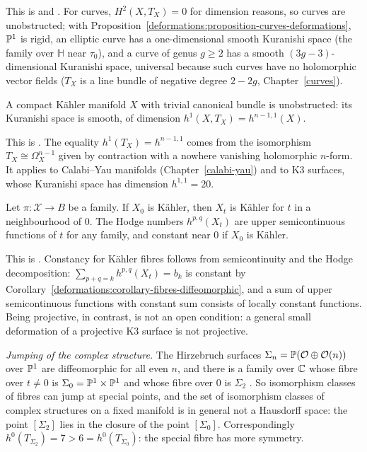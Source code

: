This is \cite[Chapter 6]{huybrechts-complex} and \cite[Chapter 9]{voisin-hodge-1}. For curves, $H^2(X, T_X) = 0$ for dimension reasons, so curves are unobstructed; with
Proposition~\ref{deformations:proposition-curves-deformations}, $\mathbb{P}^1$ is rigid, an elliptic curve has a one-dimensional smooth Kuranishi space (the family over $\mathbb{H}$ near $\tau_0$), and a curve of genus $g \geq 2$
has a smooth $(3g - 3)$-dimensional Kuranishi space, universal because such curves have no holomorphic vector fields ($T_X$ is a line bundle of negative degree $2 - 2g$, Chapter~\ref{curves}).

\begin{theorem}\label{deformations:theorem-btt}
A compact K\"ahler manifold $X$ with trivial canonical bundle is unobstructed: its Kuranishi space is smooth, of dimension $h^1(X, T_X) = h^{n-1,1}(X)$.
\end{theorem}

This is \cite[Chapter 6]{huybrechts-complex}. The equality $h^1(T_X) = h^{n-1,1}$ comes from the isomorphism $T_X \cong \Omega^{n-1}_X$ given by contraction with a nowhere vanishing holomorphic $n$-form. It applies
to Calabi--Yau manifolds (Chapter~\ref{calabi-yau}) and to K3 surfaces, whose Kuranishi space has dimension $h^{1,1} = 20$.

\begin{theorem}\label{deformations:theorem-kahler-stability}
Let $\pi \colon \mathcal{X} \to B$ be a family. If $X_0$ is K\"ahler, then $X_t$ is K\"ahler for $t$ in a neighbourhood of $0$. The Hodge numbers $h^{p,q}(X_t)$ are upper semicontinuous functions of $t$ for any
family, and constant near $0$ if $X_0$ is K\"ahler.
\end{theorem}

This is \cite[Chapter 9]{voisin-hodge-1}. Constancy for K\"ahler fibres follows from semicontinuity and the Hodge decomposition: $\sum_{p+q=k}h^{p,q}(X_t) = b_k$ is constant by
Corollary~\ref{deformations:corollary-fibres-diffeomorphic}, and a sum of upper semicontinuous functions with constant sum consists of locally constant functions. Being projective, in contrast, is not an open
condition: a general small deformation of a projective K3 surface is not projective.

\begin{remark}\label{deformations:remark-jumping}
\emph{Jumping of the complex structure.} The Hirzebruch surfaces $\Sigma_n = \mathbb{P}(\mathcal{O} \oplus \mathcal{O}(n))$ over $\mathbb{P}^1$ are diffeomorphic for all even $n$, and there is a family over $\mathbb{C}$ whose fibre over $t \neq 0$ is
$\Sigma_0 = \mathbb{P}^1 \times \mathbb{P}^1$ and whose fibre over $0$ is $\Sigma_2$ \cite{kodaira-deformations}. So isomorphism classes of fibres can jump at special points, and the set of isomorphism classes of complex
structures on a fixed manifold is in general not a Hausdorff space: the point $[\Sigma_2]$ lies in the closure of the point $[\Sigma_0]$. Correspondingly $h^0(T_{\Sigma_2}) = 7 > 6 = h^0(T_{\Sigma_0})$: the
special fibre has more symmetry.
\end{remark}

